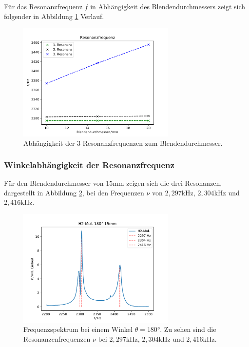 Für das Resonanzfrequenz $f$ in Abhängigkeit des Blendendurchmessers zeigt sich folgender in Abbildung \ref{fig:blende_mol}
Verlauf.
\begin{figure}[H]
    \center
    \includegraphics[width=0.7\textwidth]{plots/Hatom/res_blende.pdf}
    \caption{Abhängigkeit der 3 Resonanzfrequenzen zum Blendendurchmesser.}
    \label{fig:blende_mol}
\end{figure}

\subsubsection*{Winkelabhängigkeit der Resonanzfrequenz}
Für den Blendendurchmesser von $15$mm zeigen sich die drei Resonanzen, dargestellt in Abbildung \ref{fig:blende_16_res},
bei den Frequenzen $\nu$ von $2,297$kHz, $2,304$kHz und $2,416$kHz.
\begin{figure}[H]
    \center
    \includegraphics[width=0.7\textwidth]{plots/Hatom/zustandsaufspaltung_mol15.pdf}
    \caption{Frequenzspektrum bei einem Winkel $\theta=180°$. Zu sehen sind die Resonanzenfrequenzen $\nu$ bei $2,297$kHz, $2,304$kHz und $2,416$kHz.}
    \label{fig:blende_16_res}
\end{figure}

